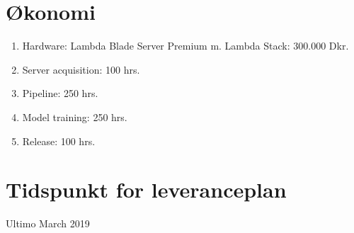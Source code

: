 \documentclass[12pt,a4paper]{article}
\begin{document}
\section*{Økonomi}
\begin{enumerate}
	\item Hardware: Lambda Blade Server Premium m. Lambda Stack: 300.000 Dkr.
 	\item Server acquisition: 100 hrs.
	\item Pipeline: 250 hrs.
	\item Model training: 250 hrs.
	\item Release: 100 hrs.
\end{enumerate}

\section*{Tidspunkt for leveranceplan}
Ultimo March 2019
\end{document}
